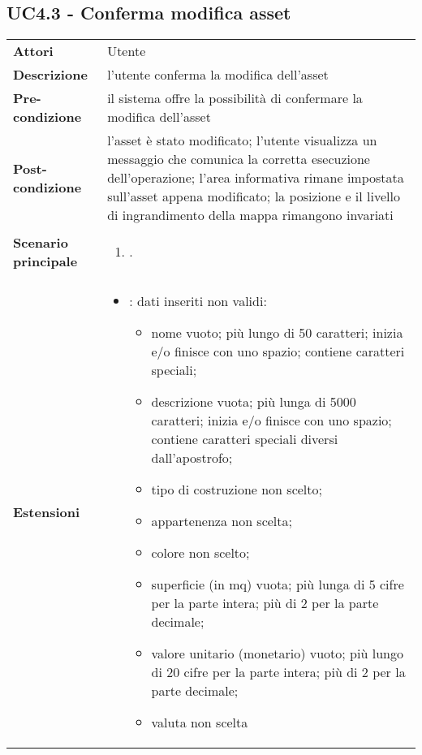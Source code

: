 \subsection{UC4.3 - Conferma modifica asset} 
\label{sssec:UC4.3} 
\def\arraystretch{1.5}
\begin{tabularx}{\textwidth}{l|p{}}
	\rowcolor{I} \multicolumn{2}{c}{\color{white}\textbf{UC4.3 - Conferma modifica asset}} \\
	\toprule
	\endhead
	\textbf{Attori} & Utente\\
	\textbf{Descrizione} & l'utente conferma la modifica dell'asset\\
	\textbf{Pre-condizione} & il sistema offre la possibilità di confermare la modifica dell'asset\\
	\textbf{Post-condizione} & l'asset è stato modificato; l'utente visualizza un messaggio che comunica la corretta esecuzione dell'operazione; l'area informativa rimane impostata sull'asset appena modificato; la posizione e il livello di ingrandimento della mappa rimangono invariati\\
	\textbf{Scenario principale} & \vspace{-1.2em}\begin{enumerate}[leftmargin=*,noitemsep,nosep]
		\item \nameref{sssec:UC4.3}.
	\end{enumerate}\\
	\textbf{Estensioni} & \vspace{-1.2em}\begin{itemize}[leftmargin=*,noitemsep,nosep]
		\item \nameref{sssec:UC4.4}: dati inseriti non validi:
		\begin{itemize}
			\item nome vuoto; più lungo di 50 caratteri;
			inizia e/o finisce con uno spazio; contiene caratteri speciali;
			\item descrizione vuota; più lunga di 5000
			caratteri; inizia e/o finisce con uno spazio; contiene caratteri
			speciali diversi dall'apostrofo;
			\item tipo di costruzione non scelto;
			\item appartenenza non scelta;
			\item colore non scelto;
			\item superficie (in mq) vuota; più lunga di
			5 cifre per la parte intera; più di 2 per la parte decimale;
			\item valore unitario (monetario) vuoto; più
			lungo di 20 cifre per la parte intera; più di 2 per la parte
			decimale;
			\item valuta non scelta
		\end{itemize}
	\end{itemize}\\
	\bottomrule
\end{tabularx}

